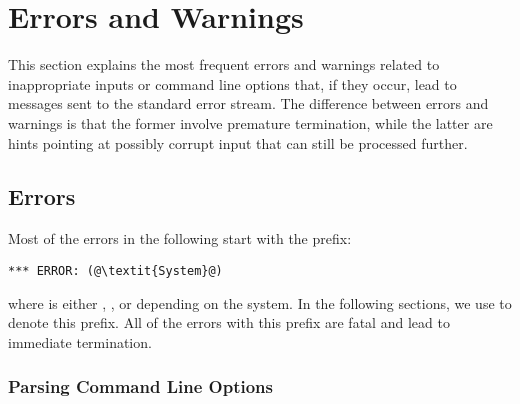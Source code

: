 \section{Errors and Warnings}\label{sec:errorwarn}

This section explains the most frequent errors and warnings 
related to inappropriate inputs or command line options that,
if they occur,
lead to messages sent to the standard error stream.
The difference between errors and warnings is that the former involve premature termination,
while the latter are hints pointing at possibly corrupt input that can still be processed further.

\subsection{Errors}\label{sec:error}

Most of the errors in the following start with the prefix:
\begin{lstlisting}[numbers=none,escapechar=@]
*** ERROR: (@\textit{System}@)
\end{lstlisting}
where  is either , , or  depending on the system.
In the following sections, we use  to denote this prefix.
All of the errors with this prefix are fatal and lead to immediate termination.

\subsubsection{Parsing Command Line Options}\label{subsec:error:options}

